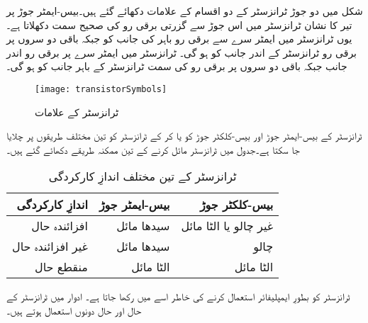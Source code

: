 شکل   میں دو جوڑ ٹرانزسٹر کے دو اقسام کے علامات دکھائے گئے ہیں۔بیس-ایمٹر  جوڑ پر تیر کا نشان ٹرانزسٹر میں اس جوڑ سے گزرتی برقی رو کی صحیح سمت دکھلاتا ہے۔یوں  ٹرانزسٹر میں ایمٹر سرے سے برقی رو  باہر کی جانب کو جبکہ باقی دو سروں پر برقی رو ٹرانزسٹر کے اندر جانب کو ہو گی۔ ٹرانزسٹر میں ایمٹر سرے پر برقی رو اندر جانب جبکہ  باقی دو سروں پر برقی رو کی سمت ٹرانزسٹر کے باہر جانب کو ہو گی۔
\begin{figure}
\centering
\texttt{[image: transistorSymbols]}
\caption{ٹرانزسٹر کے علامات}
\label{شکل_ٹرانزسٹر_کے_علامات}
\end{figure}
ٹرانزسٹر کے بیس-ایمٹر  جوڑ اور بیس-کلکٹر جوڑ کو  یا  کر کے ٹرانزسٹر کو تین مختلف طریقوں پر چلایا جا سکتا ہے۔جدول   میں ٹرانزسٹر مائل کرنے  کے تین ممکنہ طریقے دکھائے گئے ہیں۔
\begin{table}
\caption{ٹرانزسٹر کے تین مختلف اندازِ کارکردگی}
\label{جدول_ٹرانزسٹر_کے_تین_مختلف_انداز_کارکردگی}
\centering
\begin{tabular}{r r r}
\toprule
اندازِ کارکردگی & بیس-ایمٹر  جوڑ & بیس-کلکٹر جوڑ\\
\midrule

افزائندہ حال & سیدھا مائل & غیر چالو یا الٹا مائل\\
غیر افزائندہ حال& سیدھا مائل & چالو\\
منقطع حال & الٹا مائل & الٹا مائل \\
\bottomrule
\end{tabular}
\end{table}
ٹرانزسٹر کو بطورِ ایمپلیفائر استعمال کرنے کی خاطر اسے    میں رکھا جاتا ہے۔ ادوار  میں ٹرانزسٹر کے  حال  اور  حال  دونوں استعمال ہوتے ہیں۔ 

